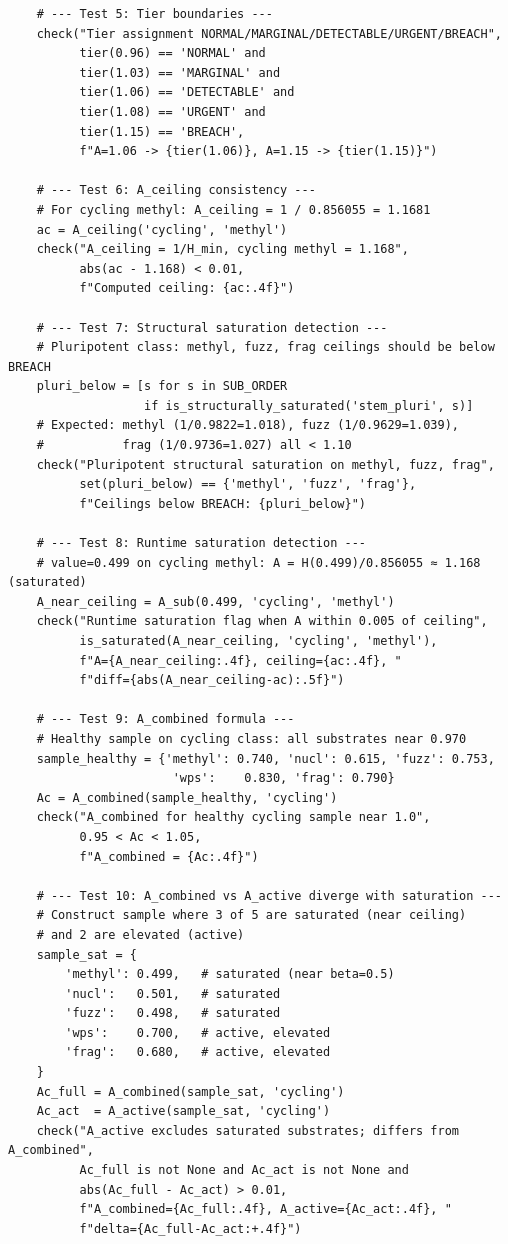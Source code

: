 \documentclass[12pt,a4paper]{article}
\begin{document}
\begin{verbatim}
    # --- Test 5: Tier boundaries ---
    check("Tier assignment NORMAL/MARGINAL/DETECTABLE/URGENT/BREACH",
          tier(0.96) == 'NORMAL' and
          tier(1.03) == 'MARGINAL' and
          tier(1.06) == 'DETECTABLE' and
          tier(1.08) == 'URGENT' and
          tier(1.15) == 'BREACH',
          f"A=1.06 -> {tier(1.06)}, A=1.15 -> {tier(1.15)}")

    # --- Test 6: A_ceiling consistency ---
    # For cycling methyl: A_ceiling = 1 / 0.856055 = 1.1681
    ac = A_ceiling('cycling', 'methyl')
    check("A_ceiling = 1/H_min, cycling methyl = 1.168",
          abs(ac - 1.168) < 0.01,
          f"Computed ceiling: {ac:.4f}")

    # --- Test 7: Structural saturation detection ---
    # Pluripotent class: methyl, fuzz, frag ceilings should be below BREACH
    pluri_below = [s for s in SUB_ORDER
                   if is_structurally_saturated('stem_pluri', s)]
    # Expected: methyl (1/0.9822=1.018), fuzz (1/0.9629=1.039),
    #           frag (1/0.9736=1.027) all < 1.10
    check("Pluripotent structural saturation on methyl, fuzz, frag",
          set(pluri_below) == {'methyl', 'fuzz', 'frag'},
          f"Ceilings below BREACH: {pluri_below}")

    # --- Test 8: Runtime saturation detection ---
    # value=0.499 on cycling methyl: A = H(0.499)/0.856055 ≈ 1.168 (saturated)
    A_near_ceiling = A_sub(0.499, 'cycling', 'methyl')
    check("Runtime saturation flag when A within 0.005 of ceiling",
          is_saturated(A_near_ceiling, 'cycling', 'methyl'),
          f"A={A_near_ceiling:.4f}, ceiling={ac:.4f}, "
          f"diff={abs(A_near_ceiling-ac):.5f}")

    # --- Test 9: A_combined formula ---
    # Healthy sample on cycling class: all substrates near 0.970
    sample_healthy = {'methyl': 0.740, 'nucl': 0.615, 'fuzz': 0.753,
                       'wps':    0.830, 'frag': 0.790}
    Ac = A_combined(sample_healthy, 'cycling')
    check("A_combined for healthy cycling sample near 1.0",
          0.95 < Ac < 1.05,
          f"A_combined = {Ac:.4f}")

    # --- Test 10: A_combined vs A_active diverge with saturation ---
    # Construct sample where 3 of 5 are saturated (near ceiling)
    # and 2 are elevated (active)
    sample_sat = {
        'methyl': 0.499,   # saturated (near beta=0.5)
        'nucl':   0.501,   # saturated
        'fuzz':   0.498,   # saturated
        'wps':    0.700,   # active, elevated
        'frag':   0.680,   # active, elevated
    }
    Ac_full = A_combined(sample_sat, 'cycling')
    Ac_act  = A_active(sample_sat, 'cycling')
    check("A_active excludes saturated substrates; differs from A_combined",
          Ac_full is not None and Ac_act is not None and
          abs(Ac_full - Ac_act) > 0.01,
          f"A_combined={Ac_full:.4f}, A_active={Ac_act:.4f}, "
          f"delta={Ac_full-Ac_act:+.4f}")


\end{verbatim}
\end{document}
